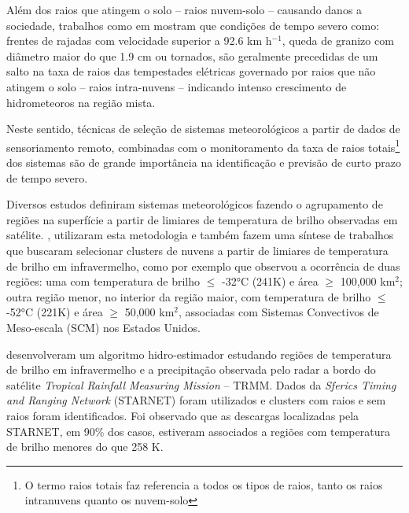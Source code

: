 Além dos raios que atingem o solo -- raios nuvem-solo -- causando danos a sociedade, trabalhos como em  mostram que condições de tempo severo como: frentes de rajadas com velocidade superior a 92.6 km h$^{-1}$, queda de granizo com diâmetro maior do que 1.9 cm ou tornados, são geralmente precedidas de um salto na taxa de raios das tempestades elétricas governado por raios que não atingem o solo -- raios intra-nuvens -- indicando intenso crescimento de hidrometeoros na região mista.      

Neste sentido, técnicas de seleção de sistemas meteorológicos a partir de dados de sensoriamento remoto, combinadas com o monitoramento da taxa de raios totais\footnote{O termo raios totais faz referencia a todos os tipos de raios, tanto os raios intranuvens quanto os nuvem-solo} dos sistemas são de grande importância na identificação e previsão de curto prazo de tempo severo. 

Diversos estudos definiram sistemas meteorológicos fazendo o agrupamento de regiões na superfície a partir de limiares de temperatura de brilho observadas em satélite. , utilizaram esta metodologia e também fazem uma síntese de trabalhos que buscaram selecionar clusters de nuvens a partir de limiares de temperatura de brilho em infravermelho, como por exemplo  que observou a ocorrência de duas regiões: uma com temperatura de brilho $\leqslant$ -32°C (241K) e área $\geqslant$ 100,000 km$^2$;  outra região menor, no interior da região maior, com temperatura de brilho $\leqslant$ -52°C (221K) e área $\geqslant$ 50,000 km$^2$, associadas com Sistemas Convectivos de Meso-escala (SCM) nos Estados Unidos.

 desenvolveram um algoritmo hidro-estimador estudando regiões de temperatura de brilho em infravermelho e a precipitação observada pelo radar a bordo do satélite \textit{Tropical Rainfall Measuring Mission} -- TRMM. Dados da \textit{Sferics Timing and Ranging Network} (STARNET) foram utilizados e clusters com raios e sem raios foram identificados. Foi observado que as descargas localizadas pela STARNET, em 90\% dos casos, estiveram associados a regiões com temperatura de brilho menores do que 258 K.





